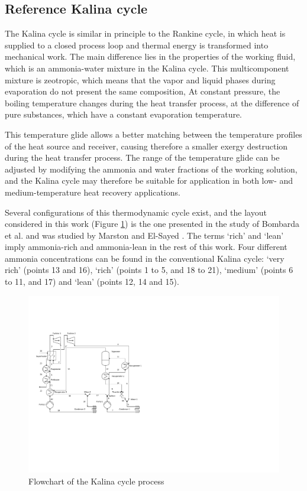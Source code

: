 \documentclass[final,times,3p]{elsarticle}
\begin{document}
\subsection{Reference Kalina cycle}
\label{sec:kalina_cycle}

The Kalina cycle is similar in principle to the Rankine cycle, in which heat is supplied to a closed process loop and thermal energy is transformed into mechanical work. The main difference lies in the properties of the working fluid, which is an ammonia-water mixture in the Kalina cycle. This multicomponent mixture is zeotropic, which means that the vapor and liquid phases during evaporation do not present the same composition, At constant pressure, the boiling temperature changes during the heat transfer process, at the difference of pure substances, which have a constant evaporation temperature. 

This temperature glide allows a better matching between the temperature profiles of the heat source and receiver, causing therefore a smaller exergy destruction during the heat transfer process. The range of the temperature glide can be adjusted by modifying the ammonia and water fractions of the working solution, and the Kalina cycle may therefore be suitable for application in both low- and medium-temperature heat recovery applications.  

Several configurations of this thermodynamic cycle exist, and the layout considered in this work (Figure \ref{fig:kalina_cycle}) is the one presented in the study of Bombarda et al. \cite{Bombarda2010b} and was studied by Marston \cite{Marston1990,Marston1995} and El-Sayed \cite{El-Sayed1985}. The terms `rich' and `lean'  imply ammonia-rich and ammonia-lean in the rest of this work. Four different ammonia concentrations can be found in the conventional Kalina cycle: `very rich' (points 13 and 16), `rich' (points 1 to 5, and 18 to 21), `medium' (points 6 to 11, and 17) and  `lean' (points 12, 14 and 15). 

\begin{figure}[htbp]
\centering
\includegraphics[width=0.9\linewidth]{Drawing_Kalina_Baseline.pdf}
\caption{Flowchart of the Kalina cycle process}
\label{fig:kalina_cycle}
\end{figure}
\end{document}
